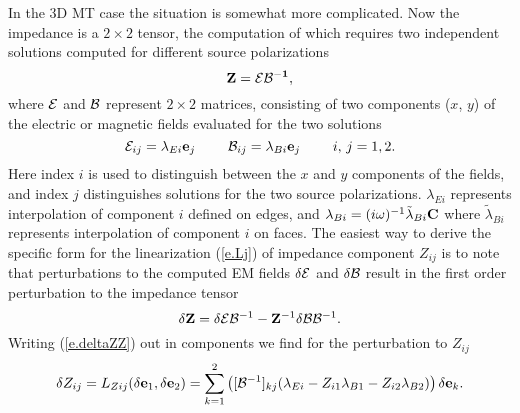 In the 3D MT case the situation is somewhat more complicated.
Now the impedance is a $2 \times 2$ tensor,
the computation of which requires two independent solutions
computed for different source polarizations
\begin{equation}
\bf Z = {\cal E}{\cal B}^{-1} ,
\end{equation}
where $\cal E$ and $\cal B$
represent $2 \times 2$ matrices, consisting
of two components ($x$, $y$) of the electric or magnetic
fields evaluated for the two solutions
\begin{equation}
\label{e.Eij}
{\cal E}_{ij} = \lambda_{Ei} {\bf e}_j
\,\,\,\,\,\,\,\,\,\,\,\,\,\,
{\cal B}_{ij} = \lambda_{Bi} {\bf e}_j 
\,\,\,\,\,\,\,\,\,\,\,\,\,\,
i, \, j = 1,2 .
\end{equation}
Here index $i$ is used to distinguish between
the $x$ and $y$ components of the fields, 
and index $j$ distinguishes solutions for 
the two source polarizations.
$\lambda_{Ei}$ represents interpolation of component
$i$ defined on edges,
and $\lambda_{Bi} = (i\omega)^{-1}\tilde\lambda_{Bi}{\bf C}$
where $\tilde\lambda_{Bi}$ represents interpolation
of component $i$ on faces.
The easiest way to derive the specific form for the linearization
(\ref{e.Lj}) of impedance component $Z_{ij}$ is to note
that perturbations to the computed
EM fields $\delta {\cal E}$ and $\delta {\cal B}$ 
result in the first order perturbation to the impedance tensor
\begin{equation}
\label{e.deltaZZ}
\delta {\bf Z} = \delta {\cal E} {\cal B}^{-1} - 
{\bf Z}^{-1} \delta {\cal B} {\cal B}^{-1} .
\end{equation}
Writing (\ref{e.deltaZZ}) out in components we find
for the perturbation to $Z_{ij}$
\begin{equation}
\label{e.ZZij}
\delta Z_{ij} = L_{Zij}(\delta {\bf e}_1, \delta {\bf e}_2) = 
\sum_{k=1}^{2} \left ( [{\cal B}^{-1}]_{kj} ( \lambda_{Ei}
-Z_{i1} \lambda_{B1} -Z_{i2} \lambda_{B2} ) \right ) \delta {\bf e}_k .
\end{equation}

